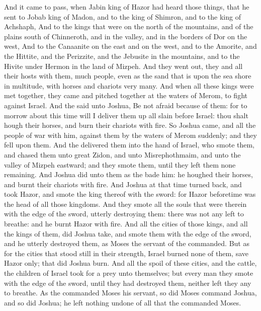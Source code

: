 \begin{biblechapter} %
 And it came to pass, when Jabin king of Hazor had heard those things, that he sent to Jobab king of Madon, and to the king of Shimron, and to the king of Achshaph,
\verse And to the kings that were on the north of the mountains, and of the plains south of Chinneroth, and in the valley, and in the borders of Dor on the west,
\verse And to the Canaanite on the east and on the west, and to the Amorite, and the Hittite, and the Perizzite, and the Jebusite in the mountains, and to the Hivite under Hermon in the land of Mizpeh.
\verse And they went out, they and all their hosts with them, much people, even as the sand that is upon the sea shore in multitude, with horses and chariots very many.
\verse And when all these kings were met together, they came and pitched together at the waters of Merom, to fight against Israel.
\verse And the \LORD said unto Joshua, Be not afraid because of them: for to morrow about this time will I deliver them up all slain before Israel: thou shalt hough their horses, and burn their chariots with fire.
\verse So Joshua came, and all the people of war with him, against them by the waters of Merom suddenly; and they fell upon them.
\verse And the \LORD delivered them into the hand of Israel, who smote them, and chased them unto great Zidon, and unto Misrephothmaim, and unto the valley of Mizpeh eastward; and they smote them, until they left them none remaining.
\verse And Joshua did unto them as the \LORD bade him: he houghed their horses, and burnt their chariots with fire.
\verse And Joshua at that time turned back, and took Hazor, and smote the king thereof with the sword: for Hazor beforetime was the head of all those kingdoms.
\verse And they smote all the souls that were therein with the edge of the sword, utterly destroying them: there was not any left to breathe: and he burnt Hazor with fire.
\verse And all the cities of those kings, and all the kings of them, did Joshua take, and smote them with the edge of the sword, and he utterly destroyed them, as Moses the servant of the \LORD commanded.
\verse But as for the cities that stood still in their strength, Israel burned none of them, save Hazor only; that did Joshua burn.
\verse And all the spoil of these cities, and the cattle, the children of Israel took for a prey unto themselves; but every man they smote with the edge of the sword, until they had destroyed them, neither left they any to breathe.
\verse As the \LORD commanded Moses his servant, so did Moses command Joshua, and so did Joshua; he left nothing undone of all that the \LORD commanded Moses.

\end{biblechapter}
